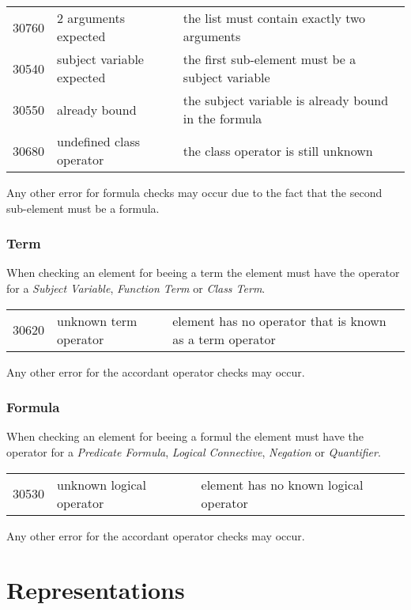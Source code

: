 \documentclass[a4paper,german,10pt,twoside]{book}
\theoremstyle{definition}
\theoremstyle{remark}
\begin{document}
\begin{tabularx}{\linewidth}{llX}
  30760  & $2$ arguments expected & the list must contain exactly two arguments \\
  30540  & subject variable expected & the first sub-element must be a subject variable \\
  30550  & already bound & the subject variable is already bound in the formula \\
  30680  & undefined class operator & the class operator is still unknown
\end{tabularx}

\par
Any other error for formula checks may occur due to the fact that the second sub-element must be a formula.


\subsection{Term
}
When checking an element for beeing a term the element must have the operator for a \emph{Subject Variable}, \emph{Function Term} or \emph{Class Term}.

\begin{tabularx}{\linewidth}{llX}
  30620  & unknown term operator & element has no operator that is known as a term operator
\end{tabularx}

\par
Any other error for the accordant operator checks may occur.


\subsection{Formula
}
When checking an element for beeing a formul the element must have the operator for a \emph{Predicate Formula}, \emph{Logical Connective}, \emph{Negation} or \emph{Quantifier}.

\begin{tabularx}{\linewidth}{llX}
  30530  & unknown logical operator & element has no known logical operator
\end{tabularx}

\par
Any other error for the accordant operator checks may occur.




\chapter{Representations} \label{chapter4} \hypertarget{chapter4}{}
\end{document}
